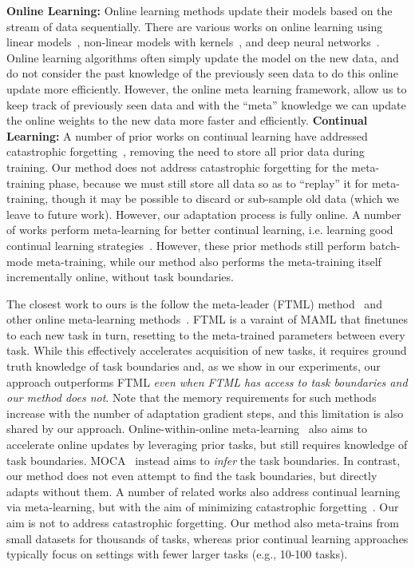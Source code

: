 \noindent \textbf{Online Learning:} Online learning methods update their models based on the stream of data sequentially. There are various works on online learning using linear models~\citep{cesa2006prediction}, non-linear models with kernels~\citep{kivinen2004online, jin2010online}, and deep neural networks~\citep{zhou2012online}. Online learning algorithms often simply update the model on the new data, and do not consider the past knowledge of the previously seen data to do this online update more efficiently. However, the online meta learning framework, allow us to keep track of previously seen data and with the ``meta'' knowledge we can update the online weights to the new data more faster and efficiently.
\noindent \textbf{Continual Learning:} 
A number of prior works on continual learning have addressed catastrophic forgetting~\citep{mccloskey1989catastrophic,li2017learning,ratcliff1990connectionist, rajasegaran2019random, rajasegaran2020itaml}, removing the need to store all prior data during training. Our method does not address catastrophic forgetting for the meta-training phase, because we must still store all data so as to ``replay'' it for meta-training, though it may be possible to discard or sub-sample old data (which we leave to future work). However, our adaptation process is fully online. A number of works perform meta-learning for better continual learning, i.e. learning good continual learning strategies~\citep{al2017continuous,nagabandi2018deep,javed2019meta,harrison2019continuous,he2019task,beaulieu2020learning}. However, these prior methods still perform batch-mode meta-training, while our method also performs the meta-training itself incrementally online, without task boundaries.


The closest work to ours is the follow the meta-leader (FTML) method~\citep{finn19a} and other online meta-learning methods~\citep{yao2020online}. FTML is a varaint of MAML that finetunes to each new task in turn, resetting to the meta-trained parameters between every task. While this effectively accelerates acquisition of new tasks, it requires ground truth knowledge of task boundaries and, as we show in our experiments, our approach outperforms FTML \emph{even when FTML has access to task boundaries and our method does not}. Note that the memory requirements for such methods increase with the number of adaptation gradient steps, and this limitation is also shared by our approach. Online-within-online meta-learning~\cite{denevi2019online} also aims to accelerate online updates by leveraging prior tasks, but still requires knowledge of task boundaries. MOCA~\cite{harrison2020continuous} instead aims to \emph{infer} the task boundaries. In contrast, our method does not even attempt to find the task boundaries, but directly adapts without them. A number of related works also address continual learning via meta-learning, but with the aim of minimizing catastrophic forgetting~\cite{gupta2020maml, caccia2020online}. Our aim is not to address catastrophic forgetting. Our method also meta-trains from small datasets for thousands of tasks, whereas prior continual learning approaches typically focus on settings with fewer larger tasks (e.g., 10-100 tasks).
